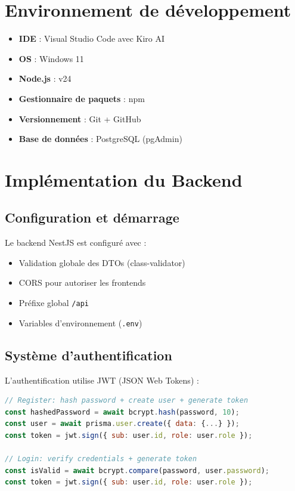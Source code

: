 \documentclass[12pt,a4paper]{report}
\begin{document}
\section{Environnement de développement}
\begin{itemize}
  \item \textbf{IDE} : Visual Studio Code avec Kiro AI
  \item \textbf{OS} : Windows 11
  \item \textbf{Node.js} : v24
  \item \textbf{Gestionnaire de paquets} : npm
  \item \textbf{Versionnement} : Git + GitHub
  \item \textbf{Base de données} : PostgreSQL (pgAdmin)
\end{itemize}

\section{Implémentation du Backend}

\subsection{Configuration et démarrage}
Le backend NestJS est configuré avec :
\begin{itemize}
  \item Validation globale des DTOs (class-validator)
  \item CORS pour autoriser les frontends
  \item Préfixe global \texttt{/api}
  \item Variables d'environnement (\texttt{.env})
\end{itemize}

\subsection{Système d'authentification}
L'authentification utilise JWT (JSON Web Tokens) :
\begin{lstlisting}[language=JavaScript, caption=Processus d'authentification]
// Register: hash password + create user + generate token
const hashedPassword = await bcrypt.hash(password, 10);
const user = await prisma.user.create({ data: {...} });
const token = jwt.sign({ sub: user.id, role: user.role });

// Login: verify credentials + generate token
const isValid = await bcrypt.compare(password, user.password);
const token = jwt.sign({ sub: user.id, role: user.role });
\end{lstlisting}
\end{document}
